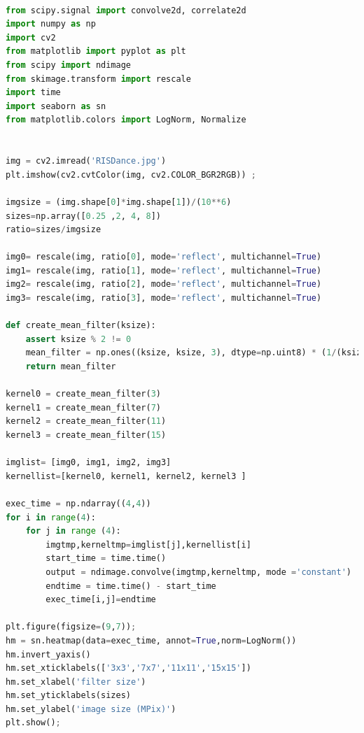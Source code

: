 \begin{lstlisting}[language=Python]

from scipy.signal import convolve2d, correlate2d
import numpy as np
import cv2
from matplotlib import pyplot as plt
from scipy import ndimage
from skimage.transform import rescale
import time
import seaborn as sn
from matplotlib.colors import LogNorm, Normalize


img = cv2.imread('RISDance.jpg')
plt.imshow(cv2.cvtColor(img, cv2.COLOR_BGR2RGB)) ;

imgsize = (img.shape[0]*img.shape[1])/(10**6)
sizes=np.array([0.25 ,2, 4, 8])
ratio=sizes/imgsize

img0= rescale(img, ratio[0], mode='reflect', multichannel=True)
img1= rescale(img, ratio[1], mode='reflect', multichannel=True)
img2= rescale(img, ratio[2], mode='reflect', multichannel=True)
img3= rescale(img, ratio[3], mode='reflect', multichannel=True)

def create_mean_filter(ksize):
    assert ksize % 2 != 0
    mean_filter = np.ones((ksize, ksize, 3), dtype=np.uint8) * (1/(ksize**2))
    return mean_filter
    
kernel0 = create_mean_filter(3)
kernel1 = create_mean_filter(7)
kernel2 = create_mean_filter(11)
kernel3 = create_mean_filter(15)

imglist= [img0, img1, img2, img3]
kernellist=[kernel0, kernel1, kernel2, kernel3 ]

exec_time = np.ndarray((4,4))
for i in range(4):
    for j in range (4):
        imgtmp,kerneltmp=imglist[j],kernellist[i]
        start_time = time.time()
        output = ndimage.convolve(imgtmp,kerneltmp, mode ='constant')
        endtime = time.time() - start_time
        exec_time[i,j]=endtime

plt.figure(figsize=(9,7));
hm = sn.heatmap(data=exec_time, annot=True,norm=LogNorm())
hm.invert_yaxis()
hm.set_xticklabels(['3x3','7x7','11x11','15x15'])
hm.set_xlabel('filter size')
hm.set_yticklabels(sizes)
hm.set_ylabel('image size (MPix)')
plt.show();
\end{lstlisting}








